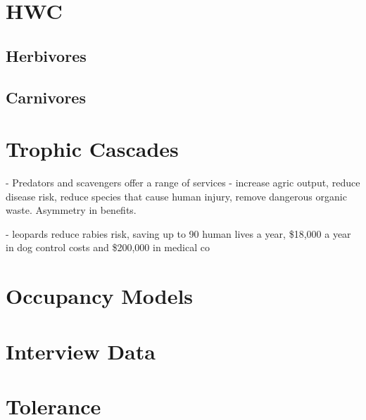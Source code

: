 \section{HWC}

\subsection{Herbivores}

\subsection{Carnivores}

\section{Trophic Cascades}

\cite{O_Bryan_2018} - Predators and scavengers offer a range of services - increase agric output, reduce disease risk, reduce species that cause human injury, remove dangerous organic waste. Asymmetry in benefits.

\cite{Braczkowski_2018} - leopards reduce rabies risk, saving up to 90 human lives a year, \$18,000 a year in dog control costs and \$200,000 in medical co

\section{Occupancy Models}

\section{Interview Data}

\section{Tolerance}
